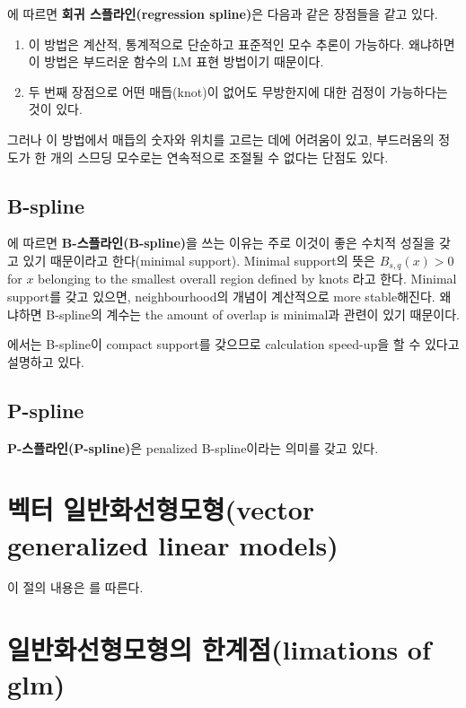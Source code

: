 \documentclass[b5paper,]{scrbook}
\theoremstyle{plain}
\theoremstyle{definition}
\numberwithin{equation}{section}
\begin{document}
\citep{Yee2015}에 따르면 \textbf{회귀 스플라인(regression spline)}은
다음과 같은 장점들을 같고 있다.

\begin{enumerate}
\def\labelenumi{\arabic{enumi}.}
\item
  이 방법은 계산적, 통계적으로 단순하고 표준적인 모수 추론이 가능하다.
  왜냐하면 이 방법은 부드러운 함수의 LM 표현 방법이기 때문이다.
\item
  두 번째 장점으로 어떤 매듭(knot)이 없어도 무방한지에 대한 검정이
  가능하다는 것이 있다.
\end{enumerate}

그러나 이 방법에서 매듭의 숫자와 위치를 고르는 데에 어려움이 있고,
부드러움의 정도가 한 개의 스므딩 모수로는 연속적으로 조절될 수 없다는
단점도 있다.

\subsection{B-spline}\label{b-spline}

\citep{Yee2015}에 따르면 \textbf{B-스플라인(B-spline)}을 쓰는 이유는
주로 이것이 좋은 수치적 성질을 갖고 있기 때문이라고 한다(minimal
support). Minimal support의 뜻은 \(B_{s,q}(x)>0\) for \(x\) belonging to
the smallest overall region defined by knots 라고 한다. Minimal
support를 갖고 있으면, neighbourhood의 개념이 계산적으로 more
stable해진다. 왜냐하면 B-spline의 계수는 the amount of overlap is
minimal과 관련이 있기 때문이다.

\citep{Wasserman2006}에서는 B-spline이 compact support를 갖으므로
calculation speed-up을 할 수 있다고 설명하고 있다.

\subsection{P-spline}\label{p-spline}

\textbf{P-스플라인(P-spline)}은 penalized B-spline이라는 의미를 갖고
있다.

\section{벡터 일반화선형모형(vector generalized linear
models)}\label{-vector-generalized-linear-models}

이 절의 내용은 \citep{Yee2015}를 따른다.

\section{일반화선형모형의 한계점(limations of
glm)}\label{-limations-of-glm}
\end{document}
